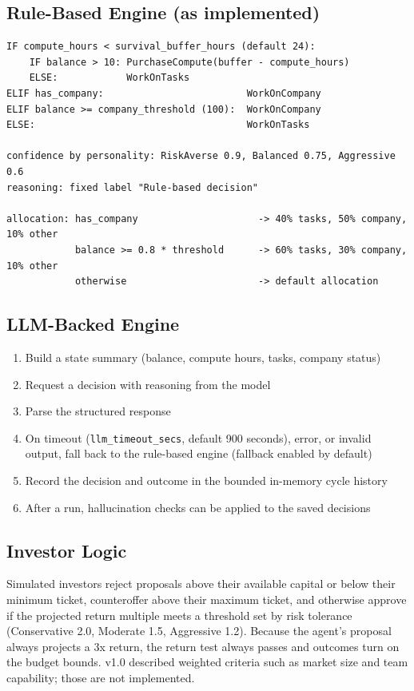 \documentclass[11pt,letterpaper]{article}
\begin{document}
\subsection{Rule-Based Engine (as implemented)}

\begin{verbatim}
IF compute_hours < survival_buffer_hours (default 24):
    IF balance > 10: PurchaseCompute(buffer - compute_hours)
    ELSE:            WorkOnTasks
ELIF has_company:                         WorkOnCompany
ELIF balance >= company_threshold (100):  WorkOnCompany
ELSE:                                     WorkOnTasks

confidence by personality: RiskAverse 0.9, Balanced 0.75, Aggressive 0.6
reasoning: fixed label "Rule-based decision"

allocation: has_company                     -> 40% tasks, 50% company, 10% other
            balance >= 0.8 * threshold      -> 60% tasks, 30% company, 10% other
            otherwise                       -> default allocation
\end{verbatim}

\subsection{LLM-Backed Engine}

\begin{enumerate}
  \item Build a state summary (balance, compute hours, tasks, company status)
  \item Request a decision with reasoning from the model
  \item Parse the structured response
  \item On timeout (\texttt{llm\_timeout\_secs}, default 900 seconds), error, or invalid output, fall back to the rule-based engine (fallback enabled by default)
  \item Record the decision and outcome in the bounded in-memory cycle history
  \item After a run, hallucination checks can be applied to the saved decisions
\end{enumerate}

\subsection{Investor Logic}

Simulated investors reject proposals above their available capital or below their minimum ticket, counteroffer above their maximum ticket, and otherwise approve if the projected return multiple meets a threshold set by risk tolerance (Conservative 2.0, Moderate 1.5, Aggressive 1.2). Because the agent's proposal always projects a 3x return, the return test always passes and outcomes turn on the budget bounds. v1.0 described weighted criteria such as market size and team capability; those are not implemented.
\end{document}

